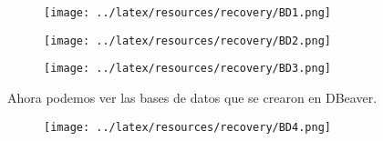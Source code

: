 \begin{figure}[h!]
    \centering
        \texttt{[image: ../latex/resources/recovery/BD1.png]}
\end{figure}

\begin{figure}[h!]
    \centering
        \texttt{[image: ../latex/resources/recovery/BD2.png]}
\end{figure}

\begin{figure}
    \centering
        \texttt{[image: ../latex/resources/recovery/BD3.png]}
\end{figure}

\newpage

Ahora podemos ver las bases de datos que se crearon en DBeaver. \\

\begin{figure}[h!]
    \centering
        \texttt{[image: ../latex/resources/recovery/BD4.png]}
\end{figure}